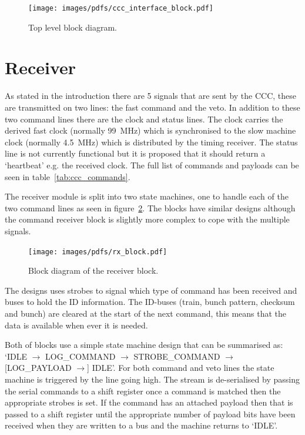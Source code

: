 \begin{figure}[htbp]
  \centering
  \texttt{[image: images/pdfs/ccc\_interface\_block.pdf]}
  \caption{Top level block diagram.}
  \label{fig:ccc_interface_block}
\end{figure}
    
\section{Receiver} %
\label{cha:receiver}
As stated in the introduction there are 5 signals that are sent by the CCC, these are transmitted on two lines: the fast command and the veto. In addition to these two command lines there are the clock and status lines. The clock carries the derived fast clock (normally 99~MHz) which is synchronised to the slow machine clock (normally 4.5~MHz) which is distributed by the timing receiver. The status line is not currently functional but it is proposed that it should return a `heartbeat' e.g. the received clock. The full list of commands and payloads can be seen in table~\ref{tab:ccc_commands}.
  
The receiver module is split into two state machines, one to handle each of the two command lines as seen in figure~\ref{fig:rx_block}. The blocks have similar designs although the command receiver block is slightly more complex to cope with the multiple signals. 
\begin{figure}[htbp] 
  \centering
  \texttt{[image: images/pdfs/rx\_block.pdf]}
  \caption{Block diagram of the receiver block.}
  \label{fig:rx_block}
\end{figure}
  
The designs uses strobes to signal which type of command has been received and buses to hold the ID information. The ID-buses (train, bunch pattern, checksum and bunch) are cleared at the start of the next command, this means that the data is available when ever it is needed.
  
Both of blocks use a simple state machine design that can be summarised as: `IDLE \( \rightarrow \) LOG\_COMMAND \( \rightarrow \) STROBE\_COMMAND \( \rightarrow \) [LOG\_PAYLOAD \( \rightarrow \)] IDLE'. For both command and veto lines the state machine is triggered by the line going high. The stream is de-serialised by passing the serial commands to a shift register once a command is matched then the appropriate strobes is set. If the command has an attached payload then that is passed to a shift register until the appropriate number of payload bits have been received when they are written to a bus and the machine returns to `IDLE'.
